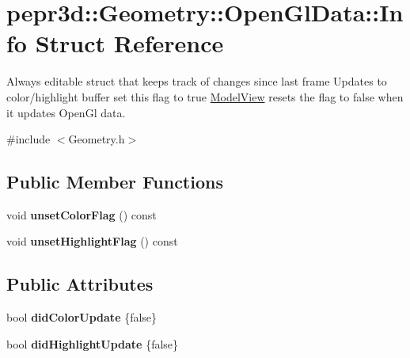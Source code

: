 \hypertarget{structpepr3d_1_1_geometry_1_1_open_gl_data_1_1_info}{}\section{pepr3d\+::Geometry\+::Open\+Gl\+Data\+::Info Struct Reference}
\label{structpepr3d_1_1_geometry_1_1_open_gl_data_1_1_info}


Always editable struct that keeps track of changes since last frame Updates to color/highlight buffer set this flag to true \mbox{\hyperlink{classpepr3d_1_1_model_view}{Model\+View}} resets the flag to false when it updates Open\+Gl data.  




{\ttfamily \#include $<$Geometry.\+h$>$}

\subsection*{Public Member Functions}
\begin{DoxyCompactItemize}
\item 
\mbox{\label{structpepr3d_1_1_geometry_1_1_open_gl_data_1_1_info_aa7de217009cc612d0c60ba0646b32fe1}} 
void {\bfseries unset\+Color\+Flag} () const
\item 
\mbox{\label{structpepr3d_1_1_geometry_1_1_open_gl_data_1_1_info_abf266ae9aa3243d75fdda0879b4a2d84}} 
void {\bfseries unset\+Highlight\+Flag} () const
\end{DoxyCompactItemize}
\subsection*{Public Attributes}
\begin{DoxyCompactItemize}
\item 
\mbox{\label{structpepr3d_1_1_geometry_1_1_open_gl_data_1_1_info_a656b05f913dd19c3ef18246fc7e447df}} 
bool {\bfseries did\+Color\+Update} \{false\}
\item 
\mbox{\label{structpepr3d_1_1_geometry_1_1_open_gl_data_1_1_info_a06361f61ab346c1975ec81b7f068f590}} 
bool {\bfseries did\+Highlight\+Update} \{false\}
\end{DoxyCompactItemize}


